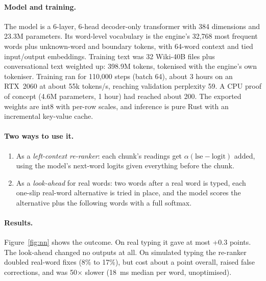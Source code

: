 \documentclass[11pt,a4paper]{article}
\begin{document}
\paragraph{Model and training.} The model is a 6-layer, 6-head decoder-only transformer with 384 dimensions and 23.3M parameters. Its word-level vocabulary is the engine's 32,768 most frequent words plus unknown-word and boundary tokens, with 64-word context and tied input/output embeddings. Training text was 32 Wiki-40B files plus conversational text weighted up: 398.9M tokens, tokenised with the engine's own tokeniser. Training ran for 110,000 steps (batch 64), about 3 hours on an RTX~2060 at about 55k tokens/s, reaching validation perplexity 59. A CPU proof of concept (4.6M parameters, 1 hour) had reached about 200. The exported weights are int8 with per-row scales, and inference is pure Rust with an incremental key-value cache.

\paragraph{Two ways to use it.}
\begin{enumerate}
\item As a \emph{left-context re-ranker}: each chunk's readings get $\alpha(\mathrm{lse}-\mathrm{logit})$ added, using the model's next-word logits given everything before the chunk.
\item As a \emph{look-ahead} for real words: two words after a real word is typed, each one-slip real-word alternative is tried in place, and the model scores the alternative plus the following words with a full softmax.
\end{enumerate}

\paragraph{Results.} Figure~\ref{fig:nn} shows the outcome. On real typing it gave at most +0.3 points. The look-ahead changed no outputs at all. On simulated typing the re-ranker doubled real-word fixes (8\% to 17\%), but cost about a point overall, raised false corrections, and was 50$\times$ slower (18~ms median per word, unoptimised).
\end{document}
